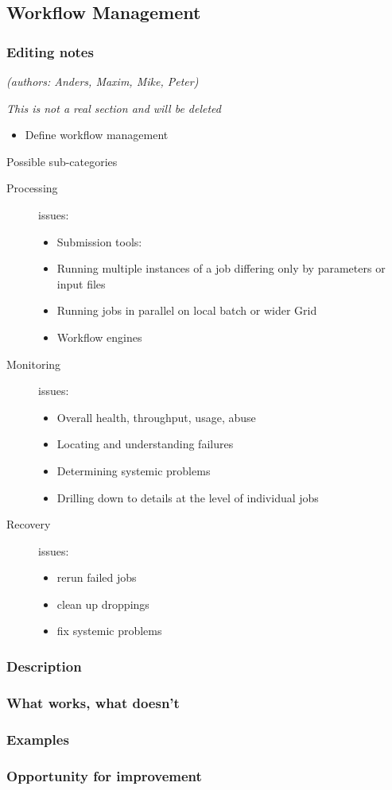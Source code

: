 \subsection{Workflow Management}

\subsubsection{Editing notes}

\textit{(authors: Anders, Maxim, Mike, Peter)}

\textit{This is not a real section and will be deleted}

\begin{itemize}
\item Define workflow management
\end{itemize}
Possible sub-categories
\begin{description}
\item[Processing] issues:

  \begin{itemize}
  \item Submission tools:
  \item Running multiple instances of a job differing only by parameters or input files
  \item Running jobs in parallel on local batch or wider Grid
  \item Workflow engines
  \end{itemize}
\item[Monitoring] issues:
  \begin{itemize}
  \item Overall health, throughput, usage, abuse
  \item Locating and understanding failures
  \item Determining systemic problems
  \item Drilling down to details at the level of individual jobs
  \end{itemize}
\item[Recovery] issues:
  \begin{itemize}
  \item rerun failed jobs
  \item clean up droppings
  \item fix systemic problems
  \end{itemize}
\end{description}

\subsubsection{Description}
\subsubsection{What works, what doesn't}
\subsubsection{Examples}
\subsubsection{Opportunity for improvement}
